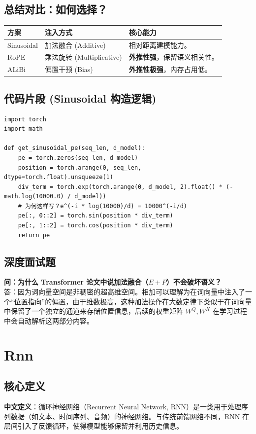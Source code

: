 \documentclass[12pt, a4paper]{book}
\begin{document}
\section{总结对比：如何选择？}
\begin{table}[h!]
\centering
\begin{tabularx}{\textwidth}{|l|X|X|}
\hline
\textbf{方案} & \textbf{注入方式} & \textbf{核心能力} \\
\hline
Sinusoidal & 加法融合 (Additive) & 相对距离建模能力。 \\
\hline
RoPE & 乘法旋转 (Multiplicative) & \textbf{外推性强}，保留语义相关性。 \\
\hline
ALiBi & 偏置干预 (Bias) & \textbf{外推性极强}，内存占用低。 \\
\hline
\end{tabularx}
\end{table}

\section{代码片段 (Sinusoidal 构造逻辑)}
\begin{lstlisting}
import torch
import math

def get_sinusoidal_pe(seq_len, d_model):
    pe = torch.zeros(seq_len, d_model)
    position = torch.arange(0, seq_len, dtype=torch.float).unsqueeze(1)
    div_term = torch.exp(torch.arange(0, d_model, 2).float() * (-math.log(10000.0) / d_model))
    # 为何这样写？e^(-i * log(10000)/d) = 10000^(-i/d)
    pe[:, 0::2] = torch.sin(position * div_term)
    pe[:, 1::2] = torch.cos(position * div_term)
    return pe
\end{lstlisting}

\section{深度面试题}
\textbf{问：为什么 Transformer 论文中说加法融合（$E+P$）不会破坏语义？}\\
答：因为词向量空间是非稠密的超高维空间。相加可以理解为在词向量中注入了一个“位置指向”的偏置，由于维数极高，这种加法操作在大数定律下类似于在词向量中保留了一个独立的通道来存储位置信息，后续的权重矩阵 $W^Q, W^K$ 在学习过程中会自动解析这两部分内容。

\chapter{Rnn}


\section{核心定义}
\textbf{中文定义}：循环神经网络（Recurrent Neural Network, RNN）是一类用于处理序列数据（如文本、时间序列、音频）的神经网络。与传统前馈网络不同，RNN 在层间引入了反馈循环，使得模型能够保留并利用历史信息。
\end{document}
